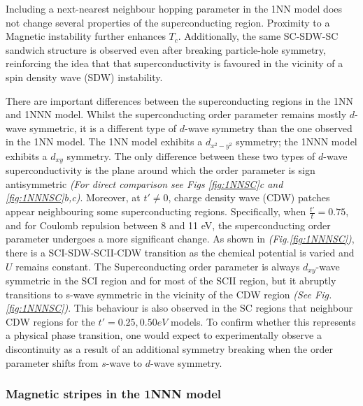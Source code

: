 \documentclass[11pt]{article}
\begin{document}
\noindent Including a next-nearest neighbour hopping parameter in the 1NN model does not 
change several properties of the superconducting region.  Proximity to a Magnetic instability further enhances $T_c$.
Additionally, the same SC-SDW-SC sandwich structure is observed even after breaking particle-hole symmetry, reinforcing the 
idea that that superconductivity is favoured in the vicinity of a  spin density wave (SDW) instability. \par
\medskip
\noindent There are important differences between the superconducting regions in the 1NN and 1NNN model. 
Whilst the superconducting order parameter remains mostly $d$-wave symmetric, it is a different type
of $d$-wave symmetry than the one observed in the 1NN model. The 1NN model exhibits a $d_{x^2-y^2}$ symmetry; the 1NNN model
exhibits a $d_{xy}$ symmetry\cite{butler2012point}. The only difference between these two types of $d$-wave superconductivity is the plane around which the order parameter is sign antisymmetric
\textit{(For direct comparison see Figs \ref{fig:1NNSC}c and \ref{fig:1NNNSC}b,c)}. 
Moreover, at $t' \neq 0 $, charge density wave (CDW) patches appear neighbouring some superconducting regions.
Specifically, when $\frac{t'}{t} = 0.75$, and for Coulomb repulsion between 8 and 11 eV, the superconducting order parameter undergoes a more significant change.
As shown in \textit{(Fig.\ref{fig:1NNNSC})}, there is a SCI-SDW-SCII-CDW transition as the chemical potential is varied and $U$ remains constant. 
The Superconducting order parameter 
is always $d_{xy}$-wave symmetric in the SCI region and for most of the SCII region, but it abruptly transitions to 
s-wave symmetric in the vicinity of the CDW region \textit{(See Fig.\ref{fig:1NNNSC})}. This behaviour is also observed in the SC regions that neighbour CDW regions for 
the $t' = 0.25, 0.50 eV$ models. To confirm whether this represents a physical phase transition, one would expect to experimentally observe a 
discontinuity as a result of an additional symmetry breaking when the order parameter shifts from $s$-wave to $d$-wave symmetry.





\subsubsection{Magnetic stripes in the 1NNN model}
\label{subsec:Stripes1NNN}
\end{document}
